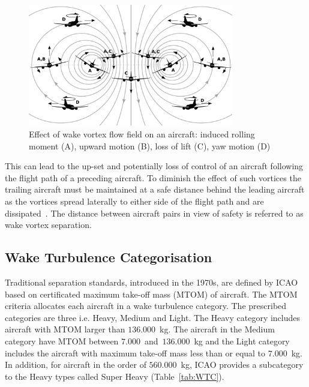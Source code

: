 \begin{figure}[h]
    \centering
    \includegraphics[width=0.8\textwidth]{graphics/reaction_in_wake.jpg}
    \caption[Wake vortex encounter]{Effect of wake vortex flow field on an aircraft: induced rolling moment (A), upward motion (B), loss of lift (C), yaw motion (D)~\cite[p.~33]{Hallock2018Apr}} 
    \label{fig:vortex_encounter}
\end{figure}

This can lead to the up-set and potentially loss of control of an aircraft following the flight path of a preceding aircraft.
To diminish the effect of such vortices the trailing aircraft must be maintained at a safe distance behind the leading aircraft as the vortices spread laterally to either side of the flight path and are dissipated~\cite{Breitsamter2011Feb}.
The distance between aircraft pairs in view of safety is referred to as wake vortex separation. 

\subsection{Wake Turbulence Categorisation}
Traditional separation standards, introduced in the 1970s, are defined by ICAO based on certificated maximum take-off mass (MTOM) of aircraft. The MTOM criteria allocates each aircraft in a wake turbulence category. The prescribed categories are three i.e. Heavy, Medium and Light.
The Heavy category includes aircraft with MTOM larger than $136.000$~kg. The aircraft in the Medium category have MTOM between $7.000$~and~$136.000$~kg and the Light category includes the aircraft with maximum take-off mass less than or equal to $7.000$~kg.
In addition, for aircraft in the order of $560.000$~kg, ICAO provides a subcategory to the Heavy types called Super Heavy (Table~\ref{tab:WTC}). 


